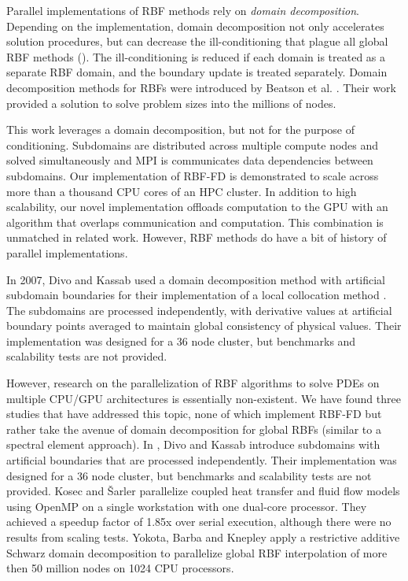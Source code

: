\documentclass[11pt]{report}
\begin{document}

Parallel implementations of RBF methods rely on \emph{domain decomposition}. Depending on the implementation, domain decomposition not only accelerates solution procedures, but can decrease the ill-conditioning that plague all global RBF methods (\cite{Divo2007}). The ill-conditioning is reduced if each domain is treated as a separate RBF domain, and the boundary update is treated separately. Domain decomposition methods for RBFs were introduced by Beatson et al. \cite{Beatson2000}. Their work provided a solution to solve problem sizes into the millions of nodes.

This work leverages a domain decomposition, but not for the purpose of conditioning. Subdomains are distributed across multiple compute nodes and solved simultaneously and MPI is communicates data dependencies between subdomains. Our implementation of RBF-FD is demonstrated to scale across more than a thousand CPU cores of an HPC cluster. In addition to high scalability, our novel implementation offloads computation to the GPU with an algorithm that overlaps communication and computation. This combination is unmatched in related work. However, RBF methods do have a bit of history of parallel implementations. 

In 2007, Divo and Kassab \cite{Divo2007} used a domain decomposition method with artificial 
subdomain boundaries for their implementation of a local collocation method \cite{Divo2007}. 
The subdomains are processed independently, with derivative values 
at artificial boundary points averaged to maintain global consistency of physical values. Their implementation 
was designed for a 36 node cluster, but benchmarks and scalability tests are not provided.

However, research on the parallelization of RBF algorithms to solve PDEs on multiple CPU/GPU architectures is essentially non-existent. We have found three studies that have addressed this topic, none of which implement RBF-FD but rather take the avenue of domain decomposition for global RBFs (similar to a spectral element approach). In \cite{Divo2007}, Divo and Kassab introduce subdomains with artificial boundaries that are processed independently. Their implementation was designed for a 36 node cluster, but benchmarks and scalability tests are not provided. Kosec and \v{S}arler \cite{Kosec2008} parallelize coupled heat transfer and fluid flow models using OpenMP on a single workstation with one dual-core processor. They achieved a speedup factor of 1.85x over serial execution, although there were
no results from scaling tests. Yokota, Barba and Knepley \cite{Yokota2010} apply a restrictive additive Schwarz domain decomposition to parallelize global RBF interpolation of more then 50 million nodes on 1024 CPU processors.
\end{document}
